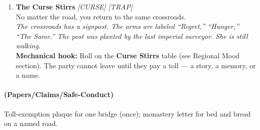 \begin{enumerate}
\item \textbf{The Curse Stirrs} \hfill {} \textit{[CURSE] [TRAP]} \\
  No matter the road, you return to the same crossroads. \\
  \textit{The crossroads has a signpost. The arms are labeled ``Regret,'' ``Hunger,'' ``The Same.'' The post was planted by the last imperial surveyor. She is still walking.} \\
  \textbf{Mechanical hook:} Roll on the \textbf{Curse Stirrs} table (see Regional Mood section). The party cannot leave until they pay a toll --- a story, a memory, or a name.
\end{enumerate}

\paragraph*{(Papers/Claims/Safe-Conduct)} Toll-exemption plaque for one bridge (once); monastery letter for bed and bread on a named road.

